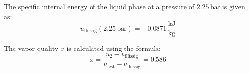 The specific internal energy of the liquid phase at a pressure of \( 2.25 \, \text{bar} \) is given as:  
\[
u_{\text{flüssig}}(2.25 \, \text{bar}) = -0.0871 \, \frac{\text{kJ}}{\text{kg}}
\]

The vapor quality \( x \) is calculated using the formula:  
\[
x = \frac{u_2 - u_{\text{flüssig}}}{u_{\text{fest}} - u_{\text{flüssig}}} = 0.586
\]